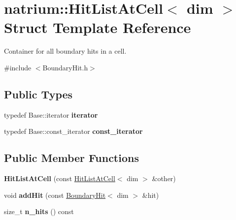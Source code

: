 \hypertarget{structnatrium_1_1HitListAtCell}{
\section{natrium::HitListAtCell$<$ dim $>$ Struct Template Reference}
\label{structnatrium_1_1HitListAtCell}
}


Container for all boundary hits in a cell.  


{\ttfamily \#include $<$BoundaryHit.h$>$}\subsection*{Public Types}
\begin{DoxyCompactItemize}
\item 
\hypertarget{structnatrium_1_1HitListAtCell_a70c3e10476a81cc29662be42b34c3340}{
typedef Base::iterator {\bfseries iterator}}
\label{structnatrium_1_1HitListAtCell_a70c3e10476a81cc29662be42b34c3340}

\item 
\hypertarget{structnatrium_1_1HitListAtCell_ac417baf35aa18a4aa39240a6c5fa262d}{
typedef Base::const\_\-iterator {\bfseries const\_\-iterator}}
\label{structnatrium_1_1HitListAtCell_ac417baf35aa18a4aa39240a6c5fa262d}

\end{DoxyCompactItemize}
\subsection*{Public Member Functions}
\begin{DoxyCompactItemize}
\item 
\hypertarget{structnatrium_1_1HitListAtCell_a240a9cb897ad483eae4d101e26b2db9f}{
{\bfseries HitListAtCell} (const \hyperlink{structnatrium_1_1HitListAtCell}{HitListAtCell}$<$ dim $>$ \&other)}
\label{structnatrium_1_1HitListAtCell_a240a9cb897ad483eae4d101e26b2db9f}

\item 
\hypertarget{structnatrium_1_1HitListAtCell_a49f91c30a6d3a33f3aee9ea3d75a0f08}{
void {\bfseries addHit} (const \hyperlink{structnatrium_1_1BoundaryHit}{BoundaryHit}$<$ dim $>$ \&hit)}
\label{structnatrium_1_1HitListAtCell_a49f91c30a6d3a33f3aee9ea3d75a0f08}

\item 
\hypertarget{structnatrium_1_1HitListAtCell_a84d2aec925ebf22329c8e80754bf233a}{
size\_\-t {\bfseries n\_\-hits} () const }
\label{structnatrium_1_1HitListAtCell_a84d2aec925ebf22329c8e80754bf233a}

\end{DoxyCompactItemize}


